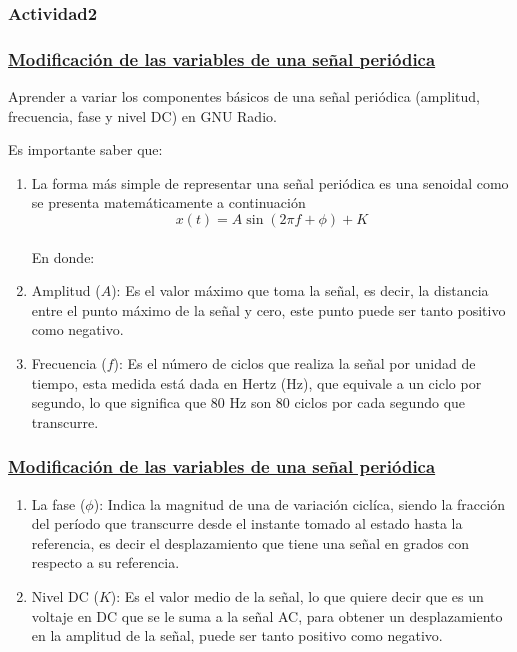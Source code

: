 \subsubsection{Actividad2}


\begin{frame}
	\frametitle{\underline{\textbf{Modificación de las variables de una señal periódica}}}
	
	Aprender a variar los componentes básicos de una señal periódica (amplitud, frecuencia, fase y nivel DC) en GNU Radio.\vspace{2mm}
	
	Es importante saber que:
	
	\begin{enumerate}[1.]
		\item{La forma más simple de representar una señal periódica es una senoidal como se presenta matemáticamente a continuación}\\
		
		$$x(t)=A\sin(2 \pi f + \phi) + K$$\\
		
		En donde:\\
		
		\item{Amplitud ($A$): Es el valor máximo que toma la señal, es decir, la distancia entre el punto máximo de la señal y cero, este punto puede ser tanto positivo como negativo.}\\
		
		\item{Frecuencia ($f$): Es el número de ciclos que realiza la señal por unidad de tiempo, esta medida está dada en Hertz (Hz), que equivale a un ciclo por segundo, lo que significa que 80 Hz son 80 ciclos por cada segundo que transcurre.}\\
		
	\end{enumerate}
\end{frame}


\begin{frame}
	\frametitle{\underline{\textbf{Modificación de las variables de una señal periódica}}}
	\begin{enumerate}[1.]
		
		\item{La fase ($\phi$): Indica la magnitud de una de variación ciclíca, siendo la fracción del período que transcurre desde el instante tomado al estado hasta la referencia, es decir el desplazamiento que tiene una señal en grados con respecto a su referencia.}\\
		
		\item{Nivel DC ($K$): Es el valor medio de la señal, lo que quiere decir que es un voltaje en DC que se le suma a la señal AC, para obtener un desplazamiento en la amplitud de la señal, puede ser tanto positivo como negativo.}\\
		
	\end{enumerate}
\end{frame}

